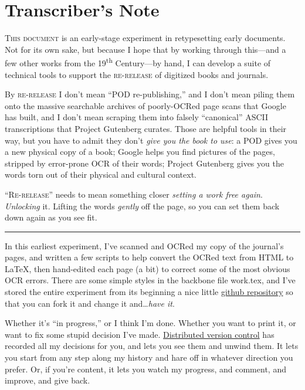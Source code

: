 \chapter*{Transcriber's Note}
\lettrine[lines=3]{T}{his document} is an early-stage experiment in retypesetting early documents. Not for its own sake, but because I hope that by working through this---and a few other works from the 19\textsuperscript{th} Century---by hand, I can develop a suite of technical tools to support the \textsc{re-release} of digitized books and journals.

By \textsc{re-release} I don't mean ``POD re-publishing,'' and I don't mean piling them onto the massive searchable archives of poorly-OCRed page scans that Google has built, and I don't mean scraping them into falsely ``canonical'' ASCII transcriptions that Project Gutenberg curates. Those are helpful tools in their way, but you have to admit they don't \emph{give you the book to use}: a POD gives  you a new physical copy of a book; Google helps you find pictures of the pages, stripped by error-prone OCR of their words; Project Gutenberg gives you the words torn out of their physical and cultural context.

\textsc{``Re-release''} needs to mean something closer \emph{setting a work free again}. \emph{Unlocking} it. Lifting the words \emph{gently}  off the page, so you can set them back down again as you see fit.

\fancybreak{\ding{167}}

In this earliest experiment, I've scanned and OCRed my copy of the journal's pages, and written a few scripts to help convert the OCRed text from HTML to \LaTeX, then hand-edited each page (a bit) to correct some of the most obvious OCR errors. There are some simple styles in the backbone file \textsf{work.tex}, and I've stored the entire experiment from its beginning a nice little \href{http://github.com/Vaguery/collegeJournalOfMedicalScienceSeptember1857}{github repository} so that you can fork it and change it and\ldots \emph{have it}.

Whether it's ``in progress,'' or I think I'm done. Whether you want to print it, or want to fix some stupid decision I've made. \href{http://git-scm.com/}{Distributed version control} has recorded all my decisions for you, and lets you see them and unwind them. It lets you start from any step along my history and hare off in whatever direction you prefer. Or, if you're content, it lets you watch my progress, and comment, and improve, and give back.


